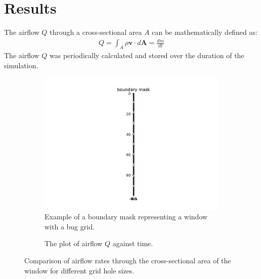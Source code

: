 \section{Results} \label{section: results}
The airflow $Q$ through a cross-sectional area $A$ can be mathematically defined as:
\begin{gather}
    Q = \int_A \rho \mathbf{v} \cdot d\mathbf{A} = \frac{dm}{dt} \label{eq: flow_rate}
\end{gather}
The airflow $Q$ was periodically calculated and stored over the duration of the simulation.

\begin{figure}[H]
    \centering
    \begin{subfigure}[b]{0.47\textwidth}
        \centering
        \includegraphics[width=\textwidth]{figures/bound_ex3.pdf}
        \caption{Example of a boundary mask representing a window with a bug grid.}
        \label{fig: bound1}
    \end{subfigure}
    \hfill
    \begin{subfigure}[b]{0.47\textwidth}
        \centering
        \caption{The plot of airflow $Q$ against time.}
        \label{fig: flowrate1}
    \end{subfigure}
    \caption{Comparison of airflow rates through the cross-sectional area of the window for different grid hole sizes.}
    \label{fig: bound_plos_flowrate1}
\end{figure}

